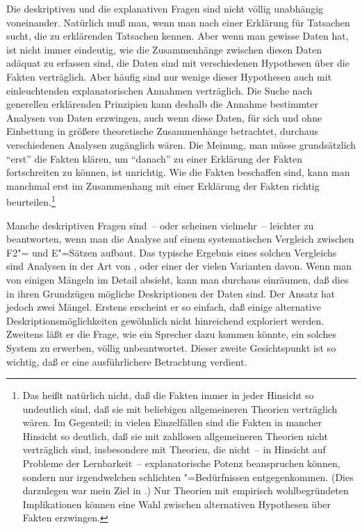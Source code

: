 \documentclass[output=paper]{langsci/langscibook}
\begin{document}
\addlines%
Die deskriptiven und die explanativen Fragen sind nicht völlig
unabhängig voneinander. Natürlich muß man, wenn man nach einer
Erklärung für Tatsachen sucht, die zu erklärenden Tatsachen
kennen. Aber wenn man gewisse Daten hat, ist nicht immer eindeutig,
wie die Zusammenhänge zwischen diesen Daten adäquat zu erfassen sind,
\dash die Daten sind mit verschiedenen Hypothesen über die Fakten
verträglich. Aber häufig sind nur wenige dieser Hypothesen auch mit
einleuchtenden explanatorischen Annahmen verträglich. Die Suche nach
generellen erklärenden Prinzipien kann deshalb die Annahme bestimmter
Analysen von Daten erzwingen, auch wenn diese Daten, für sich und ohne
Einbettung in größere theoretische Zusammenhänge betrachtet, durchaus
verschiedenen Analysen zugänglich wären. Die Meinung, man müsse
grundsätzlich "`erst"' die Fakten klären, um "`danach"' zu einer Erklärung
der Fakten fortschreiten zu können, ist unrichtig. Wie die Fakten
beschaffen sind, kann man manchmal erst im Zusammenhang mit einer
Erklärung der Fakten richtig beurteilen.\footnote{%
	Das heißt natürlich
  nicht, daß die Fakten immer in jeder Hinsicht so undeutlich sind,
  daß sie mit beliebigen allgemeineren Theorien verträglich wären. Im
  Gegenteil; in vielen Einzelfällen sind die Fakten in mancher
  Hinsicht so deutlich, daß sie mit zahllosen allgemeineren Theorien
  nicht verträglich sind, insbesondere mit Theorien, die nicht~--
  \zb in Hinsicht auf Probleme der Lernbarkeit~-- explanatorische
  Potenz beanspruchen können, sondern nur irgendwelchen schlichten
  "=Bedürfnissen entgegenkommen. (Dies darzulegen
  war mein Ziel in \citet{Hoehle80}.) Nur Theorien mit empirisch
  wohlbegründeten Implikationen können eine Wahl zwischen alternativen
  Hypothesen über Fakten erzwingen.%
}

Manche deskriptiven Fragen sind~-- oder scheinen vielmehr~-- leichter
zu
beantworten, wenn man die Analyse auf einem systematischen Vergleich
zwischen F2"= und E"=Sätzen aufbaut. Das typische Ergebnis eines solchen
Vergleichs sind Analysen in der Art von \citet{Bierwisch1963},
\citet{Klima1965} oder einer der vielen Varianten davon. Wenn man von
einigen Mängeln im Detail absieht, kann man durchaus einräumen, daß
dies in ihren Grundzügen mögliche Deskriptionen der Daten sind. Der
Ansatz hat jedoch zwei Mängel. Erstens erscheint er so einfach, daß
einige alternative Deskriptionsmöglichkeiten gewöhnlich nicht
hinreichend exploriert werden. Zweitens läßt er die Frage, wie ein
Sprecher dazu kommen könnte, ein solches System zu erwerben, völlig
unbeantwortet. Dieser zweite Gesichtspunkt ist so wichtig, daß er eine
ausführlichere Betrachtung verdient.
\end{document}
